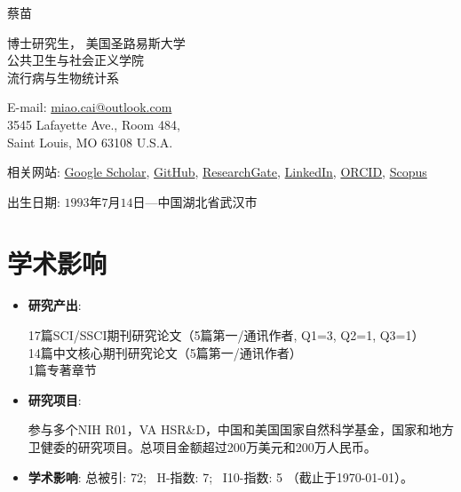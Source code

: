 \documentclass[11pt, a4paper]{article}
\newcommand{\fzxbs}{\CJKfamily{MyCJKfzxbs}}
\begin{document}
	{\LARGE {\fzxbs 蔡苗}}\vspace{0.3cm}
	
	\begin{minipage}[b]{0.65\linewidth}
		博士研究生， 美国圣路易斯大学\\
		公共卫生与社会正义学院\\
		流行病与生物统计系
	\end{minipage}
	\hfill
	\begin{minipage}[b]{0.35\linewidth}
		E-mail: \href{mailto:miao.cai@outlook.com}{miao.cai@outlook.com}\\
		3545 Lafayette Ave., Room 484, \\
		Saint Louis, MO 63108 U.S.A.
	\end{minipage}
	
	相关网站: 
	\href{https://scholar.google.com/citations?user=kjFCzEkAAAAJ&hl=en}{Google Scholar},
	\href{https://github.com/caimiao0714}{GitHub},
	\href{https://www.researchgate.net/profile/Miao_Cai2}{ResearchGate},
	\href{https://www.linkedin.com/in/miao-cai-7b5a62a3/}{LinkedIn},
	\href{https://orcid.org/0000-0003-0170-6905}{ORCID}, 
	\href{https://www.scopus.com/authid/detail.uri?authorId=56824998300}{Scopus}
	
	出生日期: $1993$年$7$月$14$日---中国湖北省武汉市
	
	\section*{学术影响}
	\begin{itemize}[leftmargin=0ex,itemsep=0ex]
		\item \textbf{研究产出}: 
		\begin{minipage}[t]{0.9\linewidth}
			17篇SCI/SSCI期刊研究论文（5篇第一/通讯作者, Q1=3, Q2=1, Q3=1）\\
			14篇中文核心期刊研究论文（5篇第一/通讯作者）\\
			1篇专著章节
		\end{minipage}
		
		\item \textbf{研究项目}: 
		\begin{minipage}[t]{0.9\linewidth}
			参与多个NIH R01，VA HSR\&D，中国和美国国家自然科学基金，国家和地方卫健委的研究项目。总项目金额超过200万美元和200万人民币。
		\end{minipage}

		
		\item \textbf{学术影响}: 总被引: 72; $\,$ H-指数: 7; $\,$ I10-指数: 5 （截止于\today）。
	\end{itemize}
	
\end{document}
